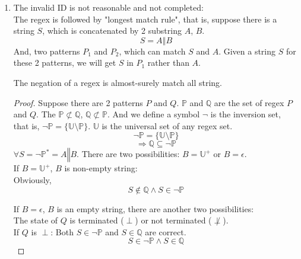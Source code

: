 \documentclass[12pt,a4paper]{article}
\newenvironment{claim}[1]{\par\noindent{Claim:}\space#1}{}
\begin{document}
\begin{CJK}{UTF8}{bsmi}
\begin{enumerate}
        \item The invalid ID is not reasonable and not completed:\\
              The regex is followed by "longest match rule", that is, suppose there is a string $S$,
              which is concatenated by 2 substring $A$, $B$.  $$S = A \mathbin\Vert B$$
              And, two patterns $P_1$ and $P_2$, which can match $S$ and $A$. Given a
              string $S$ for these 2 patterns, we will get $S$ in $P_1$ rather than $A$.\\
              \begin{claim}
                  The negation of a regex is almost-surely match all string.
              \end{claim}
              \begin{proof}
                  Suppose there are 2 patterns $P$ and $Q$. $\mathbb{P}$ and $\mathbb{Q}$ are the
                  set of regex $P$ and $Q$. The $\mathbb{P} \not\subset \mathbb{Q}$,
                  $\mathbb{Q} \not\subset \mathbb{P}$.
                  And we define a symbol $\neg$ is the inversion set, that is, $\neg \mathbb{P} = \{\mathbb{U}
                      \setminus \mathbb{P}\}$. $\mathbb{U}$ is the universal set of any regex set.\\
                  $$\neg \mathbb{P} = \{\mathbb{U} \setminus \mathbb{P}\}$$
                  $$\Rightarrow \mathbb{Q} \subseteq \neg \mathbb{P}$$
                  $\forall S = {\neg \mathbb{P}}^* = A \mathbin\Vert B$. There are two possibilities:
                  $B = \mathbb{U}^+$ or $B = \epsilon$.\\
                  If $B = \mathbb{U}^+$, $B$ is non-empty string:\\
                  Obviously,
                  \begin{equation}
                      S \not\in \mathbb{Q} \land S \in \neg\mathbb{P}
                  \end{equation}

                  If $B = \epsilon$, $B$ is an empty string, there are another two possibilities:\\
                  The state of $Q$ is terminated ($\perp$) or not terminated ($\not\perp$).\\
                  If $Q$ is $\perp$:
                  Both $S \in \neg \mathbb{P}$ and $S \in \mathbb{Q}$ are correct.
                  \begin{equation}
                      S \in \neg \mathbb{P} \land S \in \mathbb{Q}
                  \end{equation}


\end{proof}
\end{enumerate}
\end{CJK}
\end{document}
